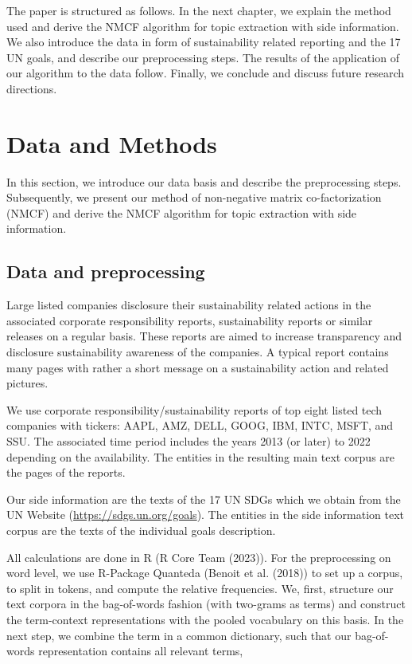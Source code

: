 \documentclass[
]{article}
\begin{document}
The paper is structured as follows. In the next chapter, we explain the method used and derive the NMCF algorithm for topic extraction with side information. We also introduce the data in form of sustainability related reporting and the 17 UN goals, and describe our preprocessing steps. The results of the application of our algorithm to the data follow. Finally, we conclude and discuss future research directions.

\hypertarget{data-and-methods}{%
\section{Data and Methods}\label{data-and-methods}}

In this section, we introduce our data basis and describe the preprocessing steps. Subsequently, we present our method of non-negative matrix co-factorization (NMCF) and derive the NMCF algorithm for topic extraction with side information.

\hypertarget{data-and-preprocessing}{%
\subsection{Data and preprocessing}\label{data-and-preprocessing}}

Large listed companies disclosure their sustainability related actions in the associated corporate responsibility reports, sustainability reports or similar releases on a regular basis. These reports are aimed to increase transparency and disclosure sustainability awareness of the companies. A typical report contains many pages with rather a short message on a sustainability action and related pictures.

We use corporate responsibility/sustainability reports of top eight listed tech companies with tickers: AAPL, AMZ, DELL, GOOG, IBM, INTC, MSFT, and SSU. The associated time period includes the years 2013 (or later) to 2022 depending on the availability. The entities in the resulting main text corpus are the pages of the reports.

Our side information are the texts of the 17 UN SDGs which we obtain from the UN Website (\url{https://sdgs.un.org/goals}). The entities in the side information text corpus are the texts of the individual goals description.

All calculations are done in R (R Core Team (2023)). For the preprocessing on word level, we use R-Package Quanteda (Benoit et al. (2018)) to set up a corpus, to split in tokens, and compute the relative frequencies. We, first, structure our text corpora in the bag-of-words fashion (with two-grams as terms) and construct the term-context representations with the pooled vocabulary on this basis. In the next step, we combine the term in a common dictionary, such that our bag-of-words representation contains all relevant terms,
\end{document}
